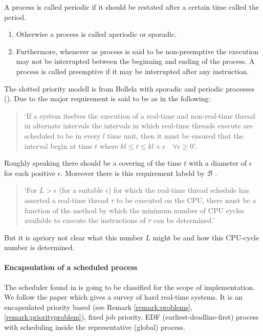 \begin{definition}
	 A process is called periodic if it should be restated after a certain time called the period.
	 \begin{enumerate}[label=(\roman*)] 
	\item Otherwise a process is called aperiodic or sporadic.
	\item Furthermore, whenever as process is said to be non-preemptive the execution may not be interrupted between the beginning and ending of the process. 
		A process is called preemptive if it may be interrupted after any instruction.
	\end{enumerate}
	\end{definition}  
 
The slotted priority modell is from Bollela \cite{B97} with  sporadic and periodic processes (\cite{K}).
Due to \cite{B97} the major requirement is said to be as in the following:

\begin{quote}
	`If a system itselves the execution of a real-time and non-real-time thread in alternate intervals the intervals in which real-time threads execute are scheduled to be in every $l$ time unit, then it must be ensured that the interval begin at time $t$ where $kl \leq t \leq kl+\epsilon \quad \forall
 \epsilon \geq 0$'.
\end{quote}

Roughly speaking there should be a covering of the time $t$ with a diameter of $\epsilon$ for each positive $\epsilon$.
Moreover there is this requirement labeld by  $\mathcal{B}$ \cite{B97}.
\begin{quote}
	`For $L>\epsilon$ (for a suitable $\epsilon$) for which the real-time thread schedule has asserted a real-time thread $\tau$ to be executed on the CPU, there must be a function of the method by which the minimum number of CPU cycles available to execute the instructions of $\tau$ can be determined.'
\end{quote}
But it is apriory not clear what this number $L$ might be and how this CPU-cycle number is determined.


\paragraph*{Encapsulation of a scheduled process}
 
	The scheduler found in \cite{K} is going to be classified for the scope of implementation. 
	We follow the paper \cite{DB2011} which gives a survey of hard real-time systems.
	It is an encapsulated priority based (see Remark \ref{remark:problems}, \ref{remark:priorityproblem}), fixed job priority,   EDF (earliest-deadline-first) process with scheduling inside the representative (global) process.


